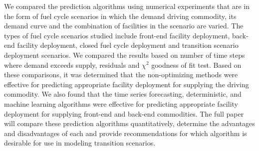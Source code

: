 \documentclass{anstrans}
\begin{document}
We compared the prediction algorithms using numerical experiments that are 
in the form of fuel cycle scenarios in which the
demand driving commodity, its demand curve and the combination of facilities 
in the scenario are varied. 
The types of fuel cycle scenarios studied include front-end facility deployment, 
back-end facility deployment, closed fuel cycle deployment and transition 
scenario deployment scenarios.
We compared the results based on number of time
steps where demand exceeds supply, residuals and $\chi^2$ goodness of fit test.
Based on these comparisons, it was determined that the non-optimizing methods
were effective for predicting 
appropriate facility deployment for supplying the driving commodity.  
We also found that the time series forecasting, deterministic,
and machine learning 
algorithms were effective for predicting appropriate facility deployment for 
supplying front-end and back-end commodities. The full paper will compare 
these prediction algorithms quantitatively, determine the advantages and 
disadvantages of each and provide recommendations for which algorithm is 
desirable for use in modeling transition scenarios. 



\end{document}
